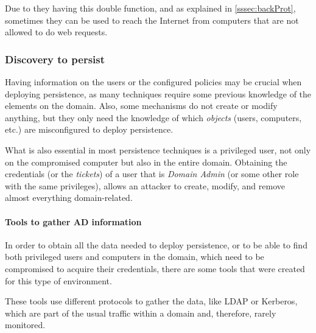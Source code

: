 Due to they having this double function, and as explained in \ref{sssec:backProt}, sometimes they can be used to reach the Internet from computers that are not allowed to do web requests.

\subsubsection{Discovery to persist}
\label{sssec:adDisc}
Having information on the users or the configured policies may be crucial when deploying persistence, as many techniques require some previous knowledge of the elements on the domain. Also, some mechanisms do not create or modify anything, but they only need the knowledge of which \textit{objects} (users, computers, etc.) are misconfigured to deploy persistence. 

What is also essential in most persistence techniques is a privileged user, not only on the compromised computer but also in the entire domain. Obtaining the credentials (or the \textit{tickets}) of a user that is \textit{Domain Admin} (or some other role with the same privileges), allows an attacker to create, modify, and remove almost everything domain-related.

\paragraph{Tools to gather AD information}
In order to obtain all the data needed to deploy persistence, or to be able to find both privileged users and computers in the domain, which need to be compromised to acquire their credentials, there are some tools that were created for this type of environment.

These tools use different protocols to gather the data, like LDAP or Kerberos, which are part of the usual traffic within a domain and, therefore, rarely monitored.  

